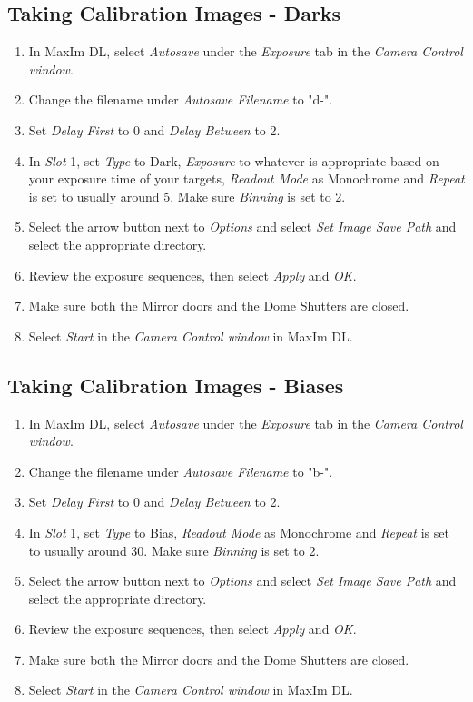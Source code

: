 \documentclass[letterpaper,12pt]{article}
\begin{document}
\subsection{Taking Calibration Images - Darks}
\begin{enumerate}
	\item In MaxIm DL, select \textit{Autosave} under the \textit{Exposure} tab in the \textit{Camera Control window}.
	
	\item Change the filename under \textit{Autosave Filename} to "d-".
	\item Set \textit{Delay First} to 0 and \textit{Delay Between} to 2.
	\item In \textit{Slot} 1, set \textit{Type} to Dark, \textit{Exposure} to whatever is appropriate based on your exposure time of your targets, \textit{Readout Mode} as Monochrome and \textit{Repeat} is set to usually around 5. Make sure \textit{Binning} is set to 2.
	\item Select the arrow button next to \textit{Options} and select \textit{Set Image Save Path} and select the appropriate directory.
	\item Review the exposure sequences, then select \textit{Apply} and \textit{OK}.
	\item Make sure both the Mirror doors and the Dome Shutters are closed.
	\item Select \textit{Start} in the \textit{Camera Control window} in MaxIm DL.
\end{enumerate}

\subsection{Taking Calibration Images - Biases}
\begin{enumerate}
	\item In MaxIm DL, select \textit{Autosave} under the \textit{Exposure} tab in the \textit{Camera Control window}.
	
	\item Change the filename under \textit{Autosave Filename} to "b-".
	\item Set \textit{Delay First} to 0 and \textit{Delay Between} to 2.
	\item In \textit{Slot} 1, set \textit{Type} to Bias, \textit{Readout Mode} as Monochrome and \textit{Repeat} is set to usually around 30. Make sure \textit{Binning} is set to 2.
	\item Select the arrow button next to \textit{Options} and select \textit{Set Image Save Path} and select the appropriate directory.
	\item Review the exposure sequences, then select \textit{Apply} and \textit{OK}.
	\item Make sure both the Mirror doors and the Dome Shutters are closed.
	\item Select \textit{Start} in the \textit{Camera Control window} in MaxIm DL.
\end{enumerate}
\newpage
\end{document}
